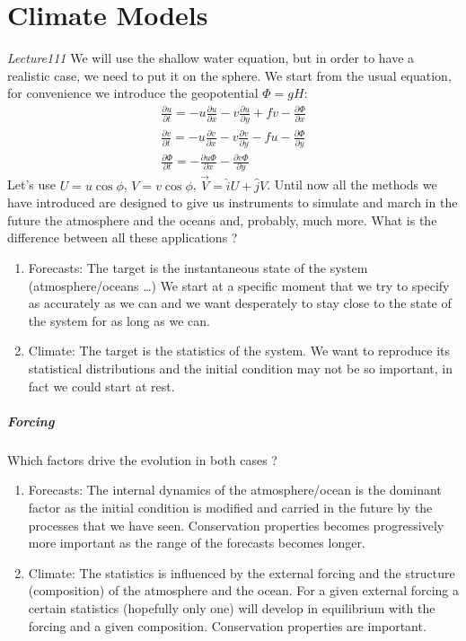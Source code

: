 \chapter{Climate Models}\textit{Lecture111}
We will use the shallow water equation, but in order to have a realistic case, we need to put it on the sphere. We start from the usual equation, for convenience we introduce the geopotential $\Phi=gH$:
\begin{align}
    \frac{\partial u}{\partial t}=-u\frac{\partial u}{\partial x}-v\frac{\partial u}{\partial y}+fv-\frac{\partial \Phi}{\partial x}\\
    \frac{\partial v}{\partial t}=-u\frac{\partial v}{\partial x}-v\frac{\partial v}{\partial y}-fu-\frac{\partial \Phi}{\partial y}\\
    \frac{\partial \Phi}{\partial t}=-\frac{\partial u\Phi}{\partial x}-\frac{\partial v\Phi}{\partial y}
\end{align}
Let's use $U=u\cos\phi$, $V=v\cos\phi$, $\vec{V}=\hat{i}U+\hat{j}V$. Until now all the methods we have introduced are designed to give us instruments to simulate and march in the future the atmosphere and the oceans and, probably, much more. What is the difference between all these applications ? 
\begin{enumerate}
    \item Forecasts: The target is the instantaneous state of the system (atmosphere/oceans …) We start at a specific moment that we try to specify as accurately as we can and we want desperately to stay close to the state of the system for as long as we can. 
    \item Climate: The target is the statistics of the system. We want to reproduce its statistical distributions and the initial condition may not be so important, in fact we could start at rest. 
\end{enumerate}
\paragraph{Forcing} Which factors drive the evolution in both cases ?
\begin{enumerate}
    \item Forecasts: The internal dynamics of the atmosphere/ocean is the dominant factor as the initial condition is modified and carried in the future by the processes that we have seen. Conservation properties becomes progressively more important as the range of the forecasts becomes longer. 
    \item Climate: The statistics is influenced by the external forcing and the structure (composition) of the atmosphere and the ocean. For a given external forcing a certain statistics (hopefully only one) will develop in equilibrium with the forcing and a given composition. Conservation properties are important.
\end{enumerate}
